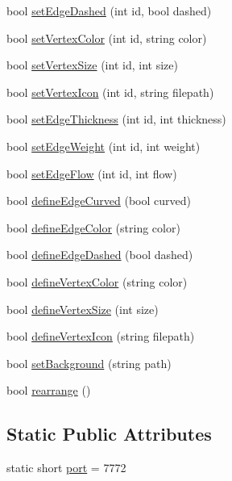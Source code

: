 \begin{DoxyCompactItemize}
\item 
bool \mbox{\hyperlink{class_graph_viewer_a1698f1c6b3a8e7cabc7b7d7cf42fc7f0}{set\+Edge\+Dashed}} (int id, bool dashed)
\item 
bool \mbox{\hyperlink{class_graph_viewer_a8b542d7e09e81a45a74760c19233beb0}{set\+Vertex\+Color}} (int id, string color)
\item 
bool \mbox{\hyperlink{class_graph_viewer_ae930dfdfcdeb7a871eefb6028d74b9f9}{set\+Vertex\+Size}} (int id, int size)
\item 
bool \mbox{\hyperlink{class_graph_viewer_a02d5f7393eab9a2d1b66719039597a64}{set\+Vertex\+Icon}} (int id, string filepath)
\item 
bool \mbox{\hyperlink{class_graph_viewer_a07f598272fe3515455eab13be749604a}{set\+Edge\+Thickness}} (int id, int thickness)
\item 
bool \mbox{\hyperlink{class_graph_viewer_ac211de009a0afe2e6d44f4f8d030a2cc}{set\+Edge\+Weight}} (int id, int weight)
\item 
bool \mbox{\hyperlink{class_graph_viewer_a69eb065145063e4dea41961e92e35c8e}{set\+Edge\+Flow}} (int id, int flow)
\item 
bool \mbox{\hyperlink{class_graph_viewer_a08f362be0e682d91e7506dca8caae1b8}{define\+Edge\+Curved}} (bool curved)
\item 
bool \mbox{\hyperlink{class_graph_viewer_a4102580b69826ba83251ef7bb262f8be}{define\+Edge\+Color}} (string color)
\item 
bool \mbox{\hyperlink{class_graph_viewer_af785279b5c204df0e274b20c36276fc3}{define\+Edge\+Dashed}} (bool dashed)
\item 
bool \mbox{\hyperlink{class_graph_viewer_a76de8676b7a93d72af514b84cdaa4d21}{define\+Vertex\+Color}} (string color)
\item 
bool \mbox{\hyperlink{class_graph_viewer_ac4b2a9fec74d38e64088aa79ca4b7d9b}{define\+Vertex\+Size}} (int size)
\item 
bool \mbox{\hyperlink{class_graph_viewer_af1adb6a361457187a820e01dcf0a34b7}{define\+Vertex\+Icon}} (string filepath)
\item 
bool \mbox{\hyperlink{class_graph_viewer_a02437b5fecd8b90de24436068312d593}{set\+Background}} (string path)
\item 
bool \mbox{\hyperlink{class_graph_viewer_a3009a66958686ccb7e78b68e37c3c423}{rearrange}} ()
\end{DoxyCompactItemize}
\subsection*{Static Public Attributes}
\begin{DoxyCompactItemize}
\item 
static short \mbox{\hyperlink{class_graph_viewer_a89d0abe75f41feededc49497cc514342}{port}} = 7772
\end{DoxyCompactItemize}


